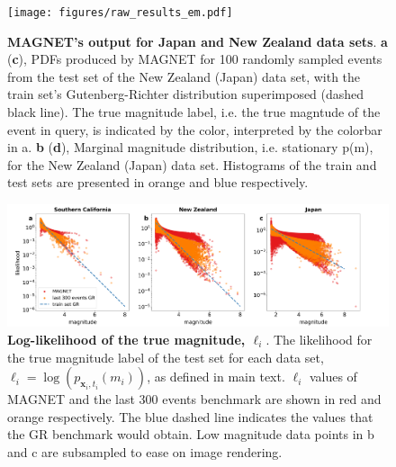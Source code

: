 \documentclass[pdflatex]{sn-jnl}
\begin{document}
\newpage
\begin{figure}[h!]
    \centering
    \texttt{[image: figures/raw\_results\_em.pdf]}
    \caption{
        \textbf{MAGNET’s output for Japan and New Zealand data sets}. \textbf{a} (\textbf{c}), PDFs produced by MAGNET for 100 randomly sampled events from the test set of the New Zealand (Japan) data set, with the train set’s Gutenberg-Richter distribution superimposed (dashed black line). The true magnitude label, i.e. the true magntude of the event in query, is indicated by the color, interpreted by the colorbar in a. \textbf{b} (\textbf{d}), Marginal magnitude distribution, i.e. stationary p(m), for the New Zealand (Japan) data set. Histograms of the train and test sets are presented in orange and blue respectively.
    }
    \label{fig:model_output_em}
\end{figure}

\newpage
\begin{figure}[h!]
    \centering
    \includegraphics[width=1\textwidth]{figures/likelihood_scatter.png}
    \caption{
    \textbf{Log-likelihood of the true magnitude, $\ell_i$}. The likelihood for the true magnitude label of the test set for each data set, $\ell_i=\log\left(p_{\textbf{x}_i, t_i}(m_i)\right)$, as defined in main text. $\ell_i$ values of MAGNET and the last 300 events benchmark are shown in red and orange respectively. The blue dashed line indicates the values that the GR benchmark would obtain. Low magnitude data points in b and c are subsampled to ease on image rendering.
    }
    \label{fig:labels_likelihood}
\end{figure}
\end{document}
